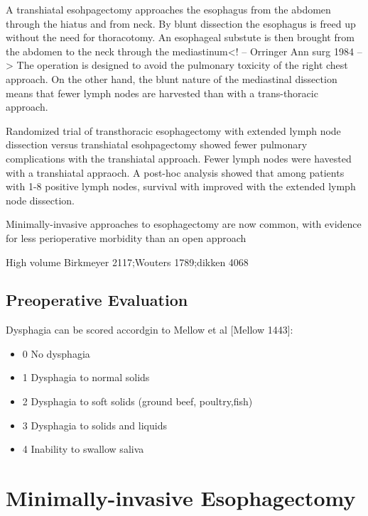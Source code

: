\documentclass[
]{book}
\providecommand{\tightlist}{%
  \setlength{\itemsep}{0pt}\setlength{\parskip}{0pt}}
\begin{document}
A transhiatal esohpagectomy approaches the esophagus from the abdomen through the hiatus and from neck. By blunt dissection the esophagus is freed up without the need for thoracotomy. An esophageal substute is then brought from the abdomen to the neck through the mediastinum\citep{orringer643}\citep{orringer282}\textless! -- Orringer Ann surg 1984 --\textgreater{} The operation is designed to avoid the pulmonary toxicity of the right chest approach. On the other hand, the blunt nature of the mediastinal dissection means that fewer lymph nodes are harvested than with a trans-thoracic approach.

Randomized trial of transthoracic esophagectomy with extended lymph node dissection versus transhiatal esohpagectomy showed fewer pulmonary complications with the transhiatal approach. \citep{hulscher1662} Fewer lymph nodes were havested with a transhiatal appraoch. A post-hoc analysis showed that among patients with 1-8 positive lymph nodes, survival with improved with the extended lymph node dissection.\citep{omloo1715}

Minimally-invasive approaches to esophagectomy are now common, with evidence for less perioperative morbidity than an open approach \citep{biere1887}\citep{zhoue0132889}

High volume Birkmeyer 2117;Wouters 1789;dikken 4068

\hypertarget{preoperative-evaluation}{%
\subsection{Preoperative Evaluation}\label{preoperative-evaluation}}

Dysphagia can be scored accordgin to Mellow et al {[}Mellow 1443{]}:

\begin{itemize}
\tightlist
\item
  0 No dysphagia
\item
  1 Dysphagia to normal solids
\item
  2 Dysphagia to soft solids (ground beef, poultry,fish)
\item
  3 Dysphagia to solids and liquids
\item
  4 Inability to swallow saliva
\end{itemize}

\hypertarget{minimally-invasive-esophagectomy-2}{%
\section{Minimally-invasive Esophagectomy}\label{minimally-invasive-esophagectomy-2}}
\end{document}
